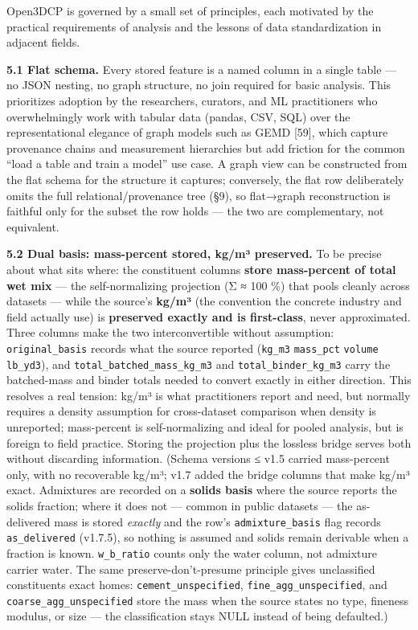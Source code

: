 \documentclass[
  11pt,
  letterpaper,
]{article}
\begin{document}
Open3DCP is governed by a small set of principles, each motivated by the
practical requirements of analysis and the lessons of data
standardization in adjacent fields.

\textbf{5.1 Flat schema.} Every stored feature is a named column in a
single table --- no JSON nesting, no graph structure, no join required
for basic analysis. This prioritizes adoption by the researchers,
curators, and ML practitioners who overwhelmingly work with tabular data
(pandas, CSV, SQL) over the representational elegance of graph models
such as GEMD {[}59{]}, which capture provenance chains and measurement
hierarchies but add friction for the common ``load a table and train a
model'' use case. A graph view can be constructed from the flat schema
for the structure it captures; conversely, the flat row deliberately
omits the full relational/provenance tree (§9), so flat→graph
reconstruction is faithful only for the subset the row holds --- the two
are complementary, not equivalent.

\textbf{5.2 Dual basis: mass-percent stored, kg/m³ preserved.} To be
precise about what sits where: the constituent columns \textbf{store
mass-percent of total wet mix} --- the self-normalizing projection (Σ ≈
100 \%) that pools cleanly across datasets --- while the source's
\textbf{kg/m³} (the convention the concrete industry and field actually
use) is \textbf{preserved exactly and is first-class}, never
approximated. Three columns make the two interconvertible without
assumption: \texttt{original\_basis} records what the source reported
(\texttt{kg\_m3} \textbar{} \texttt{mass\_pct} \textbar{}
\texttt{volume} \textbar{} \texttt{lb\_yd3}), and
\texttt{total\_batched\_mass\_kg\_m3} and \texttt{total\_binder\_kg\_m3}
carry the batched-mass and binder totals needed to convert exactly in
either direction. This resolves a real tension: kg/m³ is what
practitioners report and need, but normally requires a density
assumption for cross-dataset comparison when density is unreported;
mass-percent is self-normalizing and ideal for pooled analysis, but is
foreign to field practice. Storing the projection plus the lossless
bridge serves both without discarding information. (Schema versions ≤
v1.5 carried mass-percent only, with no recoverable kg/m³; v1.7 added
the bridge columns that make kg/m³ exact. Admixtures are recorded on a
\textbf{solids basis} where the source reports the solids fraction;
where it does not --- common in public datasets --- the as-delivered
mass is stored \emph{exactly} and the row's \texttt{admixture\_basis}
flag records \texttt{as\_delivered} (v1.7.5), so nothing is assumed and
solids remain derivable when a fraction is known. \texttt{w\_b\_ratio}
counts only the water column, not admixture carrier water. The same
preserve-don't-presume principle gives unclassified constituents exact
homes: \texttt{cement\_unspecified}, \texttt{fine\_agg\_unspecified},
and \texttt{coarse\_agg\_unspecified} store the mass when the source
states no type, fineness modulus, or size --- the classification stays
NULL instead of being defaulted.)
\end{document}
